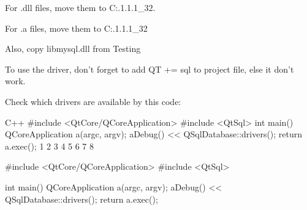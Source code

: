 For .dll files, move them to C:\Qt{}.1\5.1.1_32\plugins\sqldrivers.

For .a files, move them to C:\Qt{}.1\5.1.1_32\lib

Also, copy libmysql.dll from %
Testing

To use the driver, don’t forget to add QT += sql to project file, else it don’t work.

Check which drivers are available by this code:

C++
#include <QtCore/QCoreApplication> #include <QtSql> int main() { QCoreApplication a(argc, argv); aDebug() << QSqlDatabase::drivers(); return a.exec(); }
1
2
3
4
5
6
7
8
	
#include <QtCore/QCoreApplication>
#include <QtSql>
 
int main() {
    QCoreApplication a(argc, argv);
    aDebug() << QSqlDatabase::drivers();
    return a.exec();
}